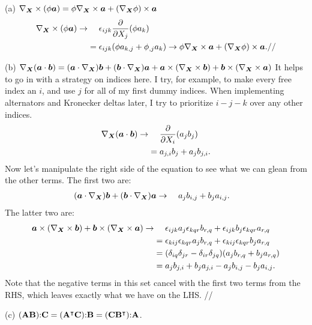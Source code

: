 \medskip
(a) $\nabla_{\bm{X}} \times (\phi \bm{a}) = \phi \nabla_{\bm{X}} \times \bm{a} + (\nabla_{\bm{X}}\phi) \times \bm{a}$
\begin{align*}
    \nabla_{\bm{X}} \times (\phi \bm{a}) \rightarrow & ~~~~ \epsilon_{ijk} \frac{\partial}{\partial X_j} (\phi a_k)\\
    &= \epsilon_{ijk} ( \phi a_{k,j} + \phi_{,j} a_k) \rightarrow \phi \nabla_{\bm{X}} \times \bm{a} + (\nabla_{\bm{X}}\phi) \times \bm{a}.//
\end{align*}

\medskip
(b) $\nabla_{\bm{X}} (\bm{a} \cdot \bm{b}) = (\bm{a} \cdot \nabla_{\bm{X}}) \bm{b} + (\bm{b} \cdot \nabla_{\bm{X}}) \bm{a} + \bm{a} \times (\nabla_{\bm{X}} \times \bm{b}) + \bm{b} \times (\nabla_{\bm{X}} \times \bm{a})$
It helps to go in with a strategy on indices here. 
I try, for example, to make every free index an $i$, and use $j$ for all of my first dummy indices. 
When implementing alternators and Kronecker deltas later, I try to prioritize $i-j-k$ over any other indices. 
\begin{align*}
    \nabla_{\bm{X}} (\bm{a} \cdot \bm{b}) \rightarrow & ~~~~\frac{\partial}{\partial X_i}(a_j b_j)\\ 
    &= a_{j,i} b_j + a_j b_{j,i}.
\end{align*}
Now let's manipulate the right side of the equation to see what we can glean from the other terms. 
The first two are:
\begin{align*}
    (\bm{a} \cdot \nabla_{\bm{X}}) \bm{b} + (\bm{b} \cdot \nabla_{\bm{X}}) \bm{a} \rightarrow & ~~~~ a_j b_{i,j} + b_j a_{i,j}.
\end{align*}
The latter two are:
\begin{align*}
    \bm{a} \times (\nabla_{\bm{X}} \times \bm{b}) + \bm{b} \times (\nabla_{\bm{X}} \times \bm{a}) \rightarrow & ~~~~ \epsilon_{ijk} a_j \epsilon_{kqr} b_{r,q} + \epsilon_{ijk} b_j \epsilon_{kqr} a_{r,q}\\
    &= \epsilon_{kij} \epsilon_{kqr} a_j b_{r,q} + \epsilon_{kij} \epsilon_{kqr} b_j a_{r,q}\\
    &= (\delta_{iq} \delta_{jr}- \delta_{ir} \delta_{jq}) (a_j b_{r,q} + b_j a_{r,q})\\
    &= a_j b_{j,i} + b_j a_{j,i} - a_j b_{i,j} - b_j a_{i,j}.
\end{align*}
Note that the negative terms in this set cancel with the first two terms from the RHS, which leaves exactly what we have on the LHS. //

(c) $ (\mathbf{A} \mathbf{B}) \mathbf{:} \mathbf{C} = (\mathbf{A}^\intercal \mathbf{C})\mathbf{:} \mathbf{B} = (\mathbf{C} \mathbf{B}^\intercal)\mathbf{:} \mathbf{A}$.

